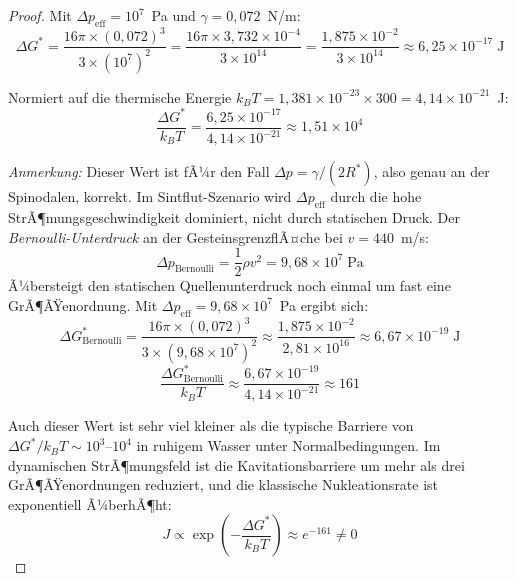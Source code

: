 ﻿\documentclass[12pt,a4paper]{report}
\begin{document}
\begin{proof}
	Mit $\Delta p_\mathrm{eff} = 10^7$~Pa und $\gamma = 0{,}072$~N/m:
	\begin{equation}
		\Delta G^* = \frac{16\pi\times(0{,}072)^3}{3\times(10^7)^2} = \frac{16\pi\times3{,}732\times10^{-4}}{3\times10^{14}} = \frac{1{,}875\times10^{-2}}{3\times10^{14}} \approx 6{,}25\times10^{-17}\;\text{J}
		\label{eq:delta_G_numerisch}
	\end{equation}
	
	Normiert auf die thermische Energie $k_BT = 1{,}381\times10^{-23}\times300 = 4{,}14\times10^{-21}$~J:
	\begin{equation}
		\frac{\Delta G^*}{k_BT} = \frac{6{,}25\times10^{-17}}{4{,}14\times10^{-21}} \approx 1{,}51\times10^{4}
		\label{eq:barrierebreite_therm}
	\end{equation}
	
	\textit{Anmerkung:} Dieser Wert ist fÃ¼r den Fall $\Delta p = \gamma/(2R^*)$, also genau an der Spinodalen, korrekt. Im Sintflut-Szenario wird $\Delta p_\mathrm{eff}$ durch die hohe StrÃ¶mungsgeschwindigkeit dominiert, nicht durch statischen Druck. Der \textit{Bernoulli-Unterdruck} an der GesteinsgrenzflÃ¤che bei $v = 440$~m/s:
	\begin{equation}
		\Delta p_\mathrm{Bernoulli} = \frac{1}{2}\rho v^2 = 9{,}68\times10^7\;\text{Pa}
		\label{eq:bernoulli_unterdruck}
	\end{equation}
	Ã¼bersteigt den statischen Quellenunterdruck noch einmal um fast eine GrÃ¶ÃŸenordnung. Mit $\Delta p_\mathrm{eff} = 9{,}68\times10^7$~Pa ergibt sich:
	\begin{equation}
		\Delta G^*_\mathrm{Bernoulli} = \frac{16\pi\times(0{,}072)^3}{3\times(9{,}68\times10^7)^2} \approx \frac{1{,}875\times10^{-2}}{2{,}81\times10^{16}} \approx 6{,}67\times10^{-19}\;\text{J}
		\label{eq:delta_G_bernoulli}
	\end{equation}
	\begin{equation}
		\frac{\Delta G^*_\mathrm{Bernoulli}}{k_BT} \approx \frac{6{,}67\times10^{-19}}{4{,}14\times10^{-21}} \approx 161
		\label{eq:barrierebreite_bernoulli}
	\end{equation}
	
	Auch dieser Wert ist sehr viel kleiner als die typische Barriere von $\Delta G^*/k_BT \sim 10^3$--$10^4$ in ruhigem Wasser unter Normalbedingungen. Im dynamischen StrÃ¶mungsfeld ist die Kavitationsbarriere um mehr als drei GrÃ¶ÃŸenordnungen reduziert, und die klassische Nukleationsrate ist exponentiell Ã¼berhÃ¶ht:
	\begin{equation}
		J \propto \exp\!\left(-\frac{\Delta G^*}{k_BT}\right) \approx e^{-161} \neq 0
		\label{eq:nukleationsrate}
	\end{equation}
	

\end{proof}
\end{document}
